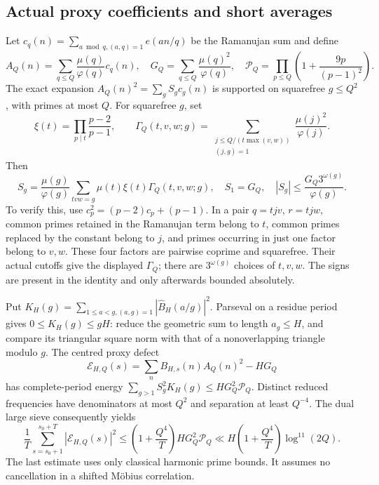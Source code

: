 \documentclass[11pt,a4paper]{article}
\theoremstyle{definition}
\theoremstyle{remark}
\begin{document}
\subsection{Actual proxy coefficients and short averages}
Let $c_q(n)=\sum_{a\bmod q,(a,q)=1}e(an/q)$ be the Ramanujan sum and define
\[ A_Q(n)=\sum_{q\le Q}\frac{\mu(q)}{\varphi(q)}c_q(n),\quad
 G_Q=\sum_{q\le Q}\frac{\mu(q)^2}{\varphi(q)},\quad
 \mathcal P_Q=\prod_{p\le Q}\left(1+\frac{9p}{(p-1)^2}\right).\]
The exact expansion $A_Q(n)^2=\sum_g S_gc_g(n)$ is supported on squarefree $g\le Q^2$, with primes at most $Q$. For squarefree $g$, set
\[\xi(t)=\prod_{p\mid t}\frac{p-2}{p-1},\qquad
 \Gamma_Q(t,v,w;g)=\sum_{\substack{j\le Q/(t\max(v,w))\\(j,g)=1}}
 \frac{\mu(j)^2}{\varphi(j)}.\]
Then
\begin{equation}\label{eq:proxy-coefficients}
 S_g=\frac{\mu(g)}{\varphi(g)}\sum_{tvw=g}\mu(t)\xi(t)\Gamma_Q(t,v,w;g),
 \quad S_1=G_Q,\quad |S_g|\le\frac{G_Q3^{\omega(g)}}{\varphi(g)}.
\end{equation}
To verify this, use $c_p^2=(p-2)c_p+(p-1)$. In a pair $q=tjv$, $r=tjw$, common primes retained in the Ramanujan term belong to $t$, common primes replaced by the constant belong to $j$, and primes occurring in just one factor belong to $v,w$. These four factors are pairwise coprime and squarefree. Their actual cutoffs give the displayed $\Gamma_Q$; there are $3^{\omega(g)}$ choices of $t,v,w$. The signs are present in the identity and only afterwards bounded absolutely.

Put $K_H(g)=\sum_{1\le a<g,(a,g)=1}|\widehat B_H(a/g)|^2$. Parseval on a residue period gives $0\le K_H(g)\le gH$: reduce the geometric sum to length $a_g\le H$, and compare its triangular square norm with that of a nonoverlapping triangle modulo $g$. The centred proxy defect
\[\mathcal E_{H,Q}(s)=\sum_nB_{H,s}(n)A_Q(n)^2-HG_Q\]
has complete-period energy $\sum_{g>1}S_g^2K_H(g)\le HG_Q^2\mathcal P_Q$.
Distinct reduced frequencies have denominators at most $Q^2$ and separation at least $Q^{-4}$. The dual large sieve \cite{MV} consequently yields
\begin{equation}\label{eq:proxy-short}
 \frac1T\sum_{s=s_0+1}^{s_0+T}|\mathcal E_{H,Q}(s)|^2
 \le\left(1+\frac{Q^4}{T}\right)HG_Q^2\mathcal P_Q
 \ll H\left(1+\frac{Q^4}{T}\right)\log^{11}(2Q).
\end{equation}
The last estimate uses only classical harmonic prime bounds. It assumes no cancellation in a shifted M\"obius correlation.
\end{document}
